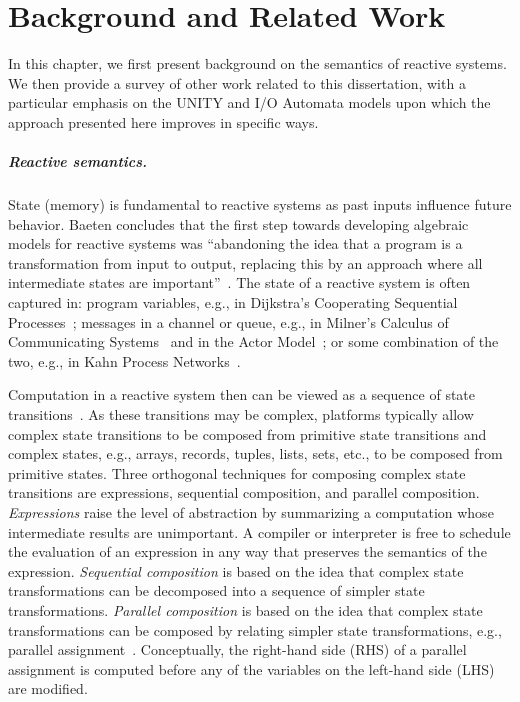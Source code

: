 \chapter{Background and Related Work}
\label{background}

In this chapter, we first present background on the semantics of reactive systems.
We then provide a survey of other work related to this dissertation, with a particular emphasis on the UNITY and I/O Automata models upon which the approach presented here improves in specific ways.

\paragraph{Reactive semantics.}
State (memory) is fundamental to reactive systems as past inputs influence future behavior.
Baeten concludes that the first step towards developing algebraic models for reactive systems was ``abandoning the idea that a program is a transformation from input to output, replacing this by an approach where all intermediate states are important''~\cite{baeten2005brief}.
The state of a reactive system is often captured in: program variables, e.g., in Dijkstra's Cooperating Sequential Processes~\cite{dijkstra1965cooperating}; messages in a channel or queue, e.g.,  in Milner's Calculus of Communicating Systems~\cite{milner1982calculus} and in the Actor Model~\cite{agha1985actors}; or some combination of the two, e.g., in Kahn Process Networks~\cite{kahn1974semantics}.

Computation in a reactive system then can be viewed as a sequence of state transitions~\cite{pnueli1981temporal}.
As these transitions may be complex, platforms typically allow complex state transitions to be composed from primitive state transitions and complex states, e.g., arrays, records, tuples, lists, sets, etc., to be composed from primitive states.
Three orthogonal techniques for composing complex state transitions are expressions, sequential composition, and parallel composition.
\emph{Expressions} raise the level of abstraction by summarizing a computation whose intermediate results are unimportant.
A compiler or interpreter is free to schedule the evaluation of an expression in any way that preserves the semantics of the expression.
\emph{Sequential composition} is based on the idea that complex state transformations can be decomposed into a sequence of simpler state transformations.
\emph{Parallel composition} is based on the idea that complex state transformations can be composed by relating simpler state transformations, e.g., parallel assignment~\cite{barron1963main}.
Conceptually, the right-hand side (RHS) of a parallel assignment is computed before any of the variables on the left-hand side (LHS) are modified.

